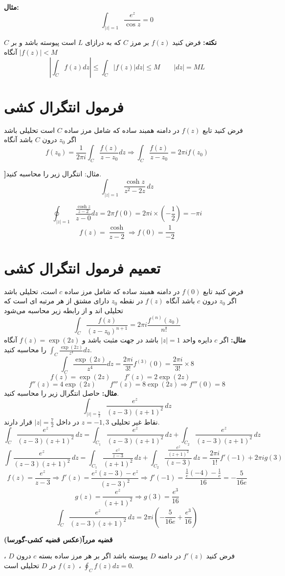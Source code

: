 \documentclass[12pt]{report}
\begin{document}
	 \textbf{مثال:}
	 $$\int_{|z| =1} \frac{e^z}{\cos z} = 0$$
	 
	 \textbf{نکته:}
	 فرض کنید
	 $f(z)$
	 بر مرز 
	 $C$
	 که به درازای 
	 $L$
	 است پیوسته باشد و بر 
	 $C$
	 $|f(z)| < M$
	 آنگاه 
	 $$|\int_{C} f(z)dz| \leq \int_{C} |f(z) |dz| \leq M \qquad |dz| = ML$$
	 
	 \section{فرمول انتگرال کشی}
	 فرض کنید تابع
	 $f(z)$
	 در دامنه همبند ساده که شامل مرز ساده 
	 $C$
	 است تحلیلی باشد اگر 
	 $z_0$
	 درون 
	 $C$
	 باشد آنگاه
	 $$f(z_0) = \frac{1}{2\pi i} \int_{C} \frac{f(z)}{z - z_0} dz \Rightarrow \int_{C} \frac{f(z)}{z - z_0} = 2\pi i f(z_0)$$
	 
	 \textbf]{مثال:}
	 انتگرال زیر را محاسبه کنید.
	 $$\int_{|z| =1} \frac{\cosh z}{z^2 - 2z}\, dz$$
	 
	 $$\oint_{|z| = 1} \frac{\frac{\cosh z}{z - 2}}{z - 0} dz = 2\pi f(0) = 2\pi i \times (-\frac{1}{2}) = -\pi i$$
	 $$f(z) = \frac{\cosh }{ z -2} \Rightarrow f(0) = \frac{1}{-2}$$
	 
	 \section{تعمیم فرمول انتگرال کشی}
	 فرض کنید تابع
	$f(0)$
	در دامنه همبند ساده که شامل مرز ساده 
	$c$
	است، تحلیلی باشد اگر 
	$z_0$
	درون 
	$c$
	باشد آنگاه 
	$f(z)$
	در نقطه 
	$z_0$
	دارای مشتق از هر مرتبه ای است که تحلیلی اند و از رابطه زیر محاسبه می‌شود
	$$\int_{C} \frac{f(z)}{(z - z_0)^{n+1}} = 2\pi i \frac{f^{(n)}(z_0)}{n!}$$
	\textbf{مثال:}
	اگر
	$c$
	دایره واحد
	$|z| = 1$
	باشد در جهت مثبت باشد و
	$f(z) = \exp(2z)$
	آنگاه
	$\int_{C} \frac{\exp(2z)}{z^4} dz$
	را محاسبه کنید.
	$$\int_{C} \frac{\exp(2z)}{z^4} dz = \frac{2\pi i }{3!} f^{(3)}(0) = \frac{2\pi i }{3!} \times 8$$
	$$f(z) = \exp(2z) \qquad
	f'(z) = 2\exp(2z)\qquad
	$$
	$$f''(z) = 4\exp(2z)\qquad
	f'''(z) = 8\exp(2z) \Rightarrow f'''(0) = 8$$
	\newline
	\textbf{مثال:}
	حاصل انتگرال زیر را محاسبه کنید.
	$$\int_{|z| =\frac{7}{2}} \frac{e^z}{(z - 3)(z+1)^2}\,dz$$
	نقاط غیر تحلیلی
	$z = -1, 3$
	در داخل
	$|z| =\frac{7}{2}$
	قرار دارند.
	$$\int_{C} \frac{e^z}{(z - 3)(z+1)^2}\, dz = \int_{C_1} \frac{e^z}{(z - 3)(z+1)^2}\, dz + \int_{C_2} \frac{e^z}{(z - 3)(z+1)^2}\, dz$$
	$$\int \frac{e^z}{(z - 3)(z+1)^2}\, dz = \int_{C_1} \frac{\frac{e^z}{z - 3}}{(z+1)^2}\, dz +\int_{C_2} \frac{\frac{e^z}{(z+ 1)^2}}{(z-3)}\, dz = \frac{2\pi i}{1!} f'(-1) + 2\pi i g(3)$$
	$$f(z) = \frac{e^z}{z - 3} \Rightarrow f'(z) = \frac{e^z(z - 3) - e^z}{(z - 3)^2} \Rightarrow f'(-1) = \frac{\frac{1}{e}(-4) - \frac{1}{e}}{16} = -\frac{5}{16e}$$
	$$g(z) = \frac{e^z}{(z + 1)^2} \Rightarrow g(3) = \frac{e^3}{16}$$
	$$\int_{C} \frac{e^z}{(z - 3)(z+1)^2}\, dz = 2\pi i(-\frac{5}{16e} + \frac{e^3}{16})$$
	
	\textbf{قضیه  مررآ(عکس قضیه کشی-گورسا)}
	
	فرض کنید
	$f'(z)$
	در دامنه 
	$D$
	پیوسته باشد اگر بر هر مرز ساده بسته 
	$c$
	درون 
	$D$
	،
	$\oint_{C} f(z) dz = 0$
	،
	$f(z)$
	در 
	$D$
	تحلیلی است.
\end{document}
